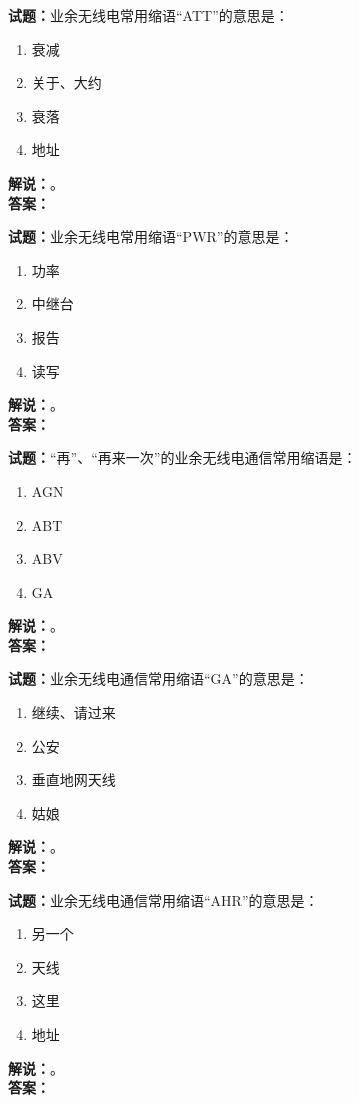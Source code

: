 \documentclass{ctexbook}
\begin{document}
\noindent\textbf{试题：}业余无线电常用缩语“ATT”的意思是：
\begin{enumerate}[leftmargin=3em]
\item 衰减
\item 关于、大约
\item 衰落
\item 地址
\end{enumerate}
\noindent\textbf{解说：}\textbf{}。\\\noindent\textbf{答案：}

\bigskip




\noindent\textbf{试题：}业余无线电常用缩语“PWR”的意思是：
\begin{enumerate}[leftmargin=3em]
\item 功率
\item 中继台
\item 报告
\item 读写
\end{enumerate}
\noindent\textbf{解说：}\textbf{}。\\\noindent\textbf{答案：}

\bigskip




\noindent\textbf{试题：}“再”、“再来一次”的业余无线电通信常用缩语是：
\begin{enumerate}[leftmargin=3em]
\item AGN
\item ABT
\item ABV
\item GA
\end{enumerate}
\noindent\textbf{解说：}\textbf{}。\\\noindent\textbf{答案：}

\bigskip




\noindent\textbf{试题：}业余无线电通信常用缩语“GA”的意思是：
\begin{enumerate}[leftmargin=3em]
\item 继续、请过来
\item 公安
\item 垂直地网天线
\item 姑娘
\end{enumerate}
\noindent\textbf{解说：}\textbf{}。\\\noindent\textbf{答案：}

\bigskip




\noindent\textbf{试题：}业余无线电通信常用缩语“AHR”的意思是：
\begin{enumerate}[leftmargin=3em]
\item 另一个
\item 天线
\item 这里
\item 地址
\end{enumerate}
\noindent\textbf{解说：}\textbf{}。\\\noindent\textbf{答案：}
\end{document}
